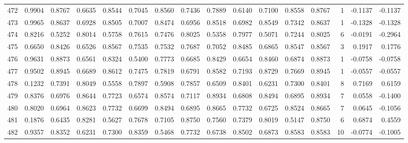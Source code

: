 \begin{tabular}{lrrrrrrrrrrrrrrr}
472 &      0.9904 &  0.8767 &  0.6635 &  0.8544 &  0.7045 &  0.8560 &  0.7436 &  0.7889 &  0.6140 &  0.7100 &   0.8558 &     0.8767 &      1 &                   -0.1137 &                    -0.1137 \\
473 &      0.9965 &  0.8637 &  0.6928 &  0.8505 &  0.7007 &  0.8474 &  0.6956 &  0.8518 &  0.6982 &  0.8549 &   0.7342 &     0.8637 &      1 &                   -0.1328 &                    -0.1328 \\
474 &      0.8216 &  0.5252 &  0.8014 &  0.5758 &  0.7615 &  0.7476 &  0.8025 &  0.5358 &  0.7977 &  0.5071 &   0.7244 &     0.8025 &      6 &                   -0.0191 &                    -0.2964 \\
475 &      0.6650 &  0.8426 &  0.6526 &  0.8567 &  0.7535 &  0.7532 &  0.7687 &  0.7052 &  0.8485 &  0.6865 &   0.8547 &     0.8567 &      3 &                    0.1917 &                     0.1776 \\
476 &      0.9631 &  0.8873 &  0.6561 &  0.8324 &  0.5400 &  0.7773 &  0.6685 &  0.8429 &  0.6654 &  0.8460 &   0.6874 &     0.8873 &      1 &                   -0.0758 &                    -0.0758 \\
477 &      0.9502 &  0.8945 &  0.6689 &  0.8612 &  0.7475 &  0.7819 &  0.6791 &  0.8582 &  0.7193 &  0.8729 &   0.7669 &     0.8945 &      1 &                   -0.0557 &                    -0.0557 \\
478 &      0.1232 &  0.7391 &  0.8049 &  0.5558 &  0.7897 &  0.5908 &  0.7857 &  0.6509 &  0.8401 &  0.6231 &   0.7300 &     0.8401 &      8 &                    0.7169 &                     0.6159 \\
479 &      0.8376 &  0.6976 &  0.8644 &  0.7723 &  0.6574 &  0.8574 &  0.7117 &  0.8934 &  0.6808 &  0.8494 &   0.6895 &     0.8934 &      7 &                    0.0558 &                    -0.1400 \\
480 &      0.8020 &  0.6964 &  0.8623 &  0.7732 &  0.6699 &  0.8494 &  0.6895 &  0.8665 &  0.7732 &  0.6725 &   0.8524 &     0.8665 &      7 &                    0.0645 &                    -0.1056 \\
481 &      0.1876 &  0.6435 &  0.8281 &  0.5627 &  0.7678 &  0.7105 &  0.8750 &  0.7560 &  0.7379 &  0.8019 &   0.5147 &     0.8750 &      6 &                    0.6874 &                     0.4559 \\
482 &      0.9357 &  0.8352 &  0.6231 &  0.7300 &  0.8359 &  0.5468 &  0.7732 &  0.6738 &  0.8502 &  0.6873 &   0.8583 &     0.8583 &     10 &                   -0.0774 &                    -0.1005 \\

\end{tabular}

